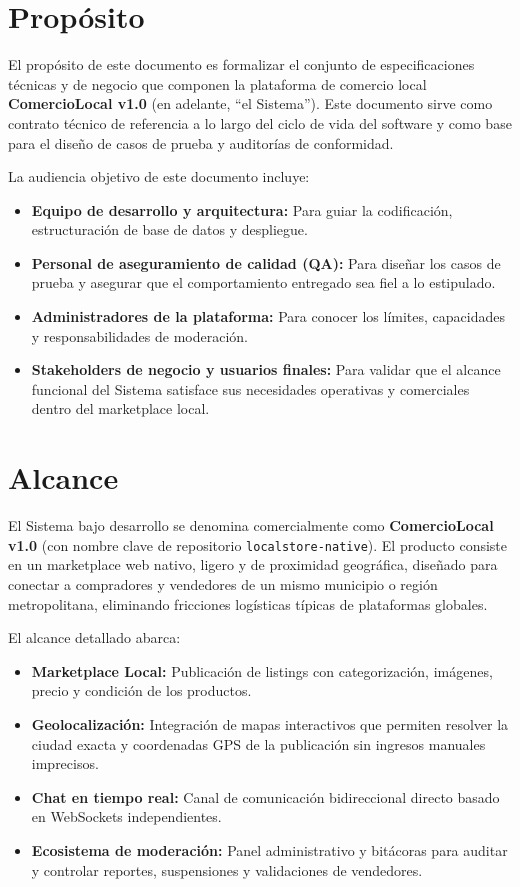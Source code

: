 \documentclass[11pt,a4paper]{report}
\begin{document}
\section{Propósito}
El propósito de este documento es formalizar el conjunto de especificaciones técnicas y de negocio que componen la plataforma de comercio local \textbf{ComercioLocal v1.0} (en adelante, ``el Sistema''). Este documento sirve como contrato técnico de referencia a lo largo del ciclo de vida del software y como base para el diseño de casos de prueba y auditorías de conformidad.

La audiencia objetivo de este documento incluye:
\begin{itemize}
    \item \textbf{Equipo de desarrollo y arquitectura:} Para guiar la codificación, estructuración de base de datos y despliegue.
    \item \textbf{Personal de aseguramiento de calidad (QA):} Para diseñar los casos de prueba y asegurar que el comportamiento entregado sea fiel a lo estipulado.
    \item \textbf{Administradores de la plataforma:} Para conocer los límites, capacidades y responsabilidades de moderación.
    \item \textbf{Stakeholders de negocio y usuarios finales:} Para validar que el alcance funcional del Sistema satisface sus necesidades operativas y comerciales dentro del marketplace local.
\end{itemize}

\section{Alcance}
El Sistema bajo desarrollo se denomina comercialmente como \textbf{ComercioLocal v1.0} (con nombre clave de repositorio \texttt{localstore-native}). El producto consiste en un marketplace web nativo, ligero y de proximidad geográfica, diseñado para conectar a compradores y vendedores de un mismo municipio o región metropolitana, eliminando fricciones logísticas típicas de plataformas globales.

El alcance detallado abarca:
\begin{itemize}
    \item \textbf{Marketplace Local:} Publicación de listings con categorización, imágenes, precio y condición de los productos.
    \item \textbf{Geolocalización:} Integración de mapas interactivos que permiten resolver la ciudad exacta y coordenadas GPS de la publicación sin ingresos manuales imprecisos.
    \item \textbf{Chat en tiempo real:} Canal de comunicación bidireccional directo basado en WebSockets independientes.
    \item \textbf{Ecosistema de moderación:} Panel administrativo y bitácoras para auditar y controlar reportes, suspensiones y validaciones de vendedores.
\end{itemize}
\end{document}
